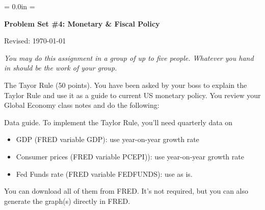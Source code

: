 \documentclass[12pt]{exam}
\def\HeadName{Problem Set \#4}
\begin{document}
\parindent = 0.0in
\parskip = \bigskipamount
\thispagestyle{empty}%
\Head

\centerline{\large \bf \HeadName: Monetary \& Fiscal Policy}
\centerline{Revised:  \today}

\medskip
{\it You may do this assignment in a group of up to five people.
Whatever you hand in should be the work of your group.}

\begin{questions}
\question The Tayor Rule (50 points).
You have been asked by your boss to explain the Taylor Rule
and use it as a guide to current US monetary policy.
You review your Global Economy class notes and do the following:
Data guide.  To implement the Taylor Rule,
you'll need quarterly data on
\begin{itemize}
\item GDP (FRED variable GDP):  use year-on-year growth rate
\item Consumer prices (FRED variable PCEPI)):  use year-on-year growth rate
\item Fed Funds rate (FRED variable FEDFUNDS):  use as is.
\end{itemize}
You can download all of them from FRED.
It's not required, but you can also generate the graph(s) directly in FRED.


\end{questions}
\end{document}
